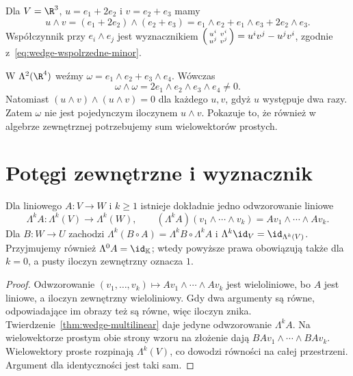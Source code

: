 \begin{przyklad}
Dla $V=\R^3$, $u=e_1+2e_2$ i $v=e_2+e_3$ mamy
\[
 u\wedge v=(e_1+2e_2)\wedge(e_2+e_3)
 =e_1\wedge e_2+e_1\wedge e_3+2e_2\wedge e_3.
\]
Współczynnik przy $e_i\wedge e_j$ jest wyznacznikiem
$\begin{psmallmatrix}u^i&v^i\\u^j&v^j\end{psmallmatrix}
=u^iv^j-u^jv^i$, zgodnie z~\eqref{eq:wedge-wspolrzedne-minor}.
\end{przyklad}

\begin{przyklad}
W $\Lambda^2(\R^4)$ weźmy
$\omega=e_1\wedge e_2+e_3\wedge e_4$. Wówczas
\[
 \omega\wedge\omega
 =2e_1\wedge e_2\wedge e_3\wedge e_4\ne0.
\]
Natomiast $(u\wedge v)\wedge(u\wedge v)=0$ dla każdego
$u,v$, gdyż $u$ występuje dwa razy. Zatem $\omega$ nie
jest pojedynczym iloczynem $u\wedge v$. Pokazuje to, że
również w algebrze zewnętrznej potrzebujemy sum wielowektorów
prostych.
\end{przyklad}

\section{Potęgi zewnętrzne i wyznacznik}
\label{sec:wyznacznik}

\begin{twierdzenie}
\label{thm:potega-zewn-operatora}
Dla liniowego $A\colon V\to W$ i $k\geq1$ istnieje dokładnie jedno odwzorowanie
liniowe
\[
 \Lambda^k A\colon\Lambda^k(V)\to\Lambda^k(W),\qquad
 (\Lambda^k A)(v_1\wedge\cdots\wedge v_k)
 =Av_1\wedge\cdots\wedge Av_k.
\]
Dla $B\colon W\to U$ zachodzi
$\Lambda^k(B\circ A)=\Lambda^k B\circ\Lambda^k A$
i $\Lambda^k\id_V=\id_{\Lambda^k(V)}$.
Przyjmujemy również $\Lambda^0A=\id_{\mathbb K}$; wtedy powyższe
prawa obowiązują także dla $k=0$, a pusty iloczyn zewnętrzny oznacza $1$.
\end{twierdzenie}
\begin{proof}
Odwzorowanie $(v_1,\ldots,v_k)\mapsto
Av_1\wedge\cdots\wedge Av_k$ jest wieloliniowe,
bo $A$ jest liniowe, a iloczyn zewnętrzny wieloliniowy.
Gdy dwa argumenty są równe, odpowiadające im obrazy też
są równe, więc iloczyn znika. Twierdzenie~\ref{thm:wedge-multilinear}
daje jedyne odwzorowanie $\Lambda^k A$.
Na wielowektorze prostym obie strony wzoru na złożenie
dają $BA v_1\wedge\cdots\wedge BA v_k$.
Wielowektory proste rozpinają $\Lambda^k(V)$, co dowodzi
równości na całej przestrzeni. Argument dla identyczności
jest taki sam.
\end{proof}

